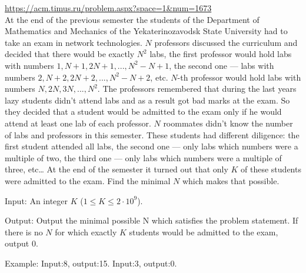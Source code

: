   \url{https://acm.timus.ru/problem.aspx?space=1&num=1673}\\
  At the end of the previous semester the students of the
  Department of Mathematics and Mechanics of the Yekaterinozavodsk State
  University had to take an exam in network technologies.
  $N$ professors discussed the curriculum and decided that there would be
  exactly $N^2$ labs, the first professor would hold labs with numbers
  $1, N + 1, 2N + 1, ..., N^2 - N + 1$, the second one — labs with numbers
  $2, N + 2, 2N + 2, ..., N^2 - N + 2$, etc.
  $N$-th professor would hold labs with numbers
  $N, 2N, 3N, ..., N^2$.
  The professors remembered that during the last years lazy students didn't
  attend labs and as a result got bad marks at the exam.
  So they decided that a student would be admitted to the exam only if
  he would attend at least one lab of each professor.
  $N$ roommates didn't know the number of labs and professors in this semester.
  These students had different diligence: the first student attended all labs,
  the second one — only labs which numbers were a multiple of two,
  the third one — only labs which numbers were a multiple of three, etc…
  At the end of the semester it turned out that only $K$ of these students
  were admitted to the exam. Find the minimal $N$ which makes that possible.

  Input:
  An integer $K$ ($1 \leq K \leq 2 \cdot 10^9$).
  
  Output:
  Output the minimal possible N which satisfies the problem statement.
  If there is no $N$ for which exactly $K$ students would be admitted to the
  exam, output 0.

  Example:
  Input:8, output:15.
  Input:3, output:0.

